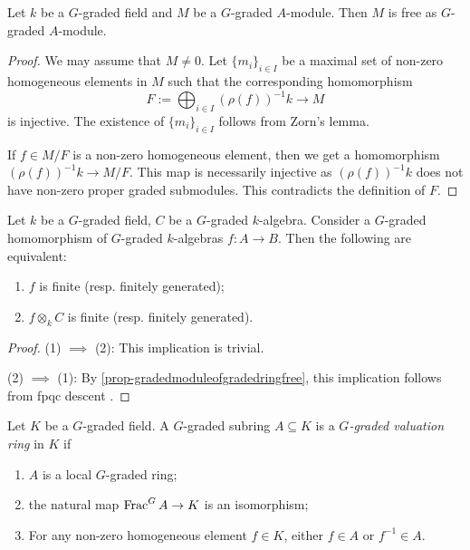 \begin{proposition}\label{prop-gradedmoduleofgradedringfree}
    Let $k$ be a $G$-graded field and $M$ be a $G$-graded $A$-module. Then $M$ is free as $G$-graded $A$-module.
\end{proposition}
\begin{proof}
    We may assume that $M\neq 0$.
    Let $\{m_i\}_{i\in I}$ be a maximal set of non-zero homogeneous elements in $M$ such that the corresponding homomorphism 
    \[
        F:=\bigoplus_{i\in I} (\rho(f))^{-1}k\rightarrow M  
    \] 
    is injective. The existence of $\{m_i\}_{i\in I}$ follows from Zorn's lemma.

    If $f\in M/F$ is a non-zero homogeneous element, then we get a homomorphism $(\rho(f))^{-1}k\rightarrow M/F$. This map is necessarily injective as $(\rho(f))^{-1}k$ does not have non-zero proper graded submodules. This contradicts the definition of $F$.
\end{proof}

\begin{corollary}\label{cor-finitegradeddescent}
    Let $k$ be a $G$-graded field, $C$ be a $G$-graded $k$-algebra. Consider a $G$-graded homomorphism of $G$-graded $k$-algebras $f:A\rightarrow B$. Then the following are equivalent:
    \begin{enumerate}
        \item $f$ is finite (resp. finitely generated);
        \item $f\otimes_k C$ is finite (resp. finitely generated).
    \end{enumerate}
\end{corollary}

\begin{proof}
    (1) $\implies$ (2): This implication is trivial.
    
    (2) $\implies$ (1): By \cref{prop-gradedmoduleofgradedringfree}, this implication follows from fpqc descent \cite[\href{https://stacks.math.columbia.edu/tag/02YJ}{Tag 02YJ}]{stacks-project}.
\end{proof}

\begin{definition}
    Let $K$ be a $G$-graded field. A $G$-graded subring $A\subseteq K$ is a \emph{$G$-graded valuation ring} in $K$ if
    \begin{enumerate}
        \item $A$ is a local $G$-graded ring;
        \item the natural map $\operatorname{Frac}^G A\rightarrow K$ is an isomorphism;
        \item For any non-zero homogeneous element $f\in K$, either $f\in A$ or $f^{-1}\in A$.
    \end{enumerate}
\end{definition}

